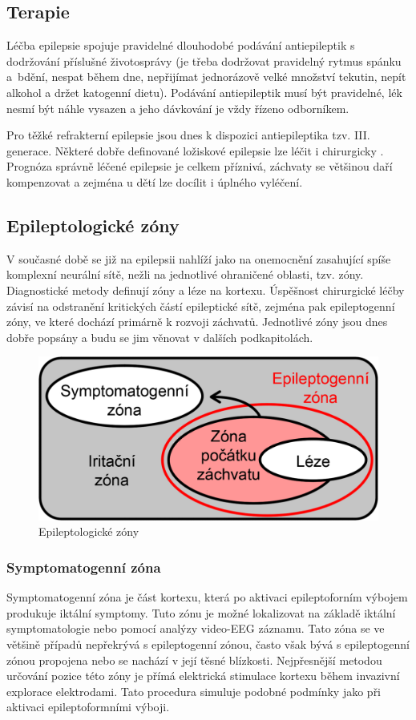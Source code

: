 \subsection{Terapie}
Léčba epilepsie spojuje pravidelné dlouhodobé podávání antiepileptik s dodržování příslušné životosprávy (je třeba dodržovat pravidelný rytmus spánku a~bdění, nespat během dne, nepřijímat jednorázově velké množství tekutin, nepít alkohol a držet katogenní dietu). Podávání antiepileptik musí být pravidelné, lék nesmí být náhle vysazen a jeho dávkování je vždy řízeno odborníkem. \cite{2}

Pro těžké refrakterní epilepsie jsou dnes k dispozici antiepileptika tzv. III. generace. Některé dobře definované ložiskové epilepsie lze léčit i chirurgicky \cite{3}. Prognóza správně léčené epilepsie je celkem příznivá, záchvaty se většinou daří kompenzovat a zejména u dětí lze docílit i úplného vyléčení. \cite{2}

\subsection{Epileptologické zóny}
V současné době se již na epilepsii nahlíží jako na onemocnění zasahující spíše komplexní neurální sítě, nežli na jednotlivé ohraničené oblasti, tzv. zóny. Diagnostické metody definují zóny a léze na kortexu. Úspěšnost chirurgické léčby závisí na odstranění kritických částí epileptické sítě, zejména pak epileptogenní zóny, ve které dochází primárně k rozvoji záchvatů. Jednotlivé zóny jsou dnes dobře popsány a budu se jim věnovat v dalších podkapitolách. \cite{4}

\begin{figure}[!h]
\includegraphics[scale = 0.2]{casti/teorie/zony.png}
\caption{Epileptologické zóny}
\end{figure}

\subsubsection{Symptomatogenní zóna}
Symptomatogenní zóna je část kortexu, která po aktivaci epileptoforním výbojem produkuje iktální symptomy. Tuto zónu je možné lokalizovat na základě iktální symptomatologie nebo pomocí analýzy video-EEG záznamu. Tato zóna se ve většině případů nepřekrývá s epileptogenní zónou, často však bývá s epileptogenní zónou propojena nebo se nachází v její těsné blízkosti. Nejpřesnější metodou určování pozice této zóny je přímá elektrická stimulace kortexu během invazivní explorace elektrodami. Tato procedura simuluje podobné podmínky jako při aktivaci epileptoformními výboji. \cite{4}

